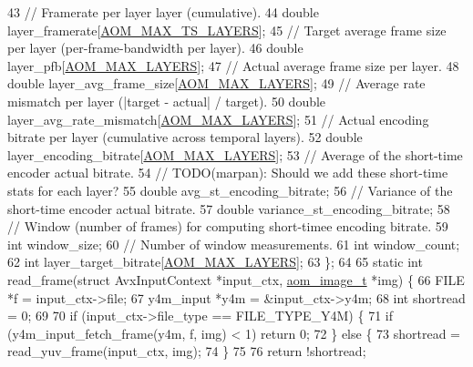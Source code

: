 \begin{DoxyCodeInclude}
43   \textcolor{comment}{// Framerate per layer layer (cumulative).}
44   \textcolor{keywordtype}{double} layer\_framerate[\hyperlink{group__aom__encoder_ga5ecd6f60f02c807e0de37df7b7278f4e}{AOM\_MAX\_TS\_LAYERS}];
45   \textcolor{comment}{// Target average frame size per layer (per-frame-bandwidth per layer).}
46   \textcolor{keywordtype}{double} layer\_pfb[\hyperlink{group__aom__encoder_ga3589babe0100b5bf7dc7167675014608}{AOM\_MAX\_LAYERS}];
47   \textcolor{comment}{// Actual average frame size per layer.}
48   \textcolor{keywordtype}{double} layer\_avg\_frame\_size[\hyperlink{group__aom__encoder_ga3589babe0100b5bf7dc7167675014608}{AOM\_MAX\_LAYERS}];
49   \textcolor{comment}{// Average rate mismatch per layer (|target - actual| / target).}
50   \textcolor{keywordtype}{double} layer\_avg\_rate\_mismatch[\hyperlink{group__aom__encoder_ga3589babe0100b5bf7dc7167675014608}{AOM\_MAX\_LAYERS}];
51   \textcolor{comment}{// Actual encoding bitrate per layer (cumulative across temporal layers).}
52   \textcolor{keywordtype}{double} layer\_encoding\_bitrate[\hyperlink{group__aom__encoder_ga3589babe0100b5bf7dc7167675014608}{AOM\_MAX\_LAYERS}];
53   \textcolor{comment}{// Average of the short-time encoder actual bitrate.}
54   \textcolor{comment}{// TODO(marpan): Should we add these short-time stats for each layer?}
55   \textcolor{keywordtype}{double} avg\_st\_encoding\_bitrate;
56   \textcolor{comment}{// Variance of the short-time encoder actual bitrate.}
57   \textcolor{keywordtype}{double} variance\_st\_encoding\_bitrate;
58   \textcolor{comment}{// Window (number of frames) for computing short-timee encoding bitrate.}
59   \textcolor{keywordtype}{int} window\_size;
60   \textcolor{comment}{// Number of window measurements.}
61   \textcolor{keywordtype}{int} window\_count;
62   \textcolor{keywordtype}{int} layer\_target\_bitrate[\hyperlink{group__aom__encoder_ga3589babe0100b5bf7dc7167675014608}{AOM\_MAX\_LAYERS}];
63 \};
64 
65 \textcolor{keyword}{static} \textcolor{keywordtype}{int} read\_frame(\textcolor{keyword}{struct} AvxInputContext *input\_ctx, \hyperlink{structaom__image}{aom\_image\_t} *img) \{
66   FILE *f = input\_ctx->file;
67   y4m\_input *y4m = &input\_ctx->y4m;
68   \textcolor{keywordtype}{int} shortread = 0;
69 
70   \textcolor{keywordflow}{if} (input\_ctx->file\_type == FILE\_TYPE\_Y4M) \{
71     \textcolor{keywordflow}{if} (y4m\_input\_fetch\_frame(y4m, f, img) < 1) \textcolor{keywordflow}{return} 0;
72   \} \textcolor{keywordflow}{else} \{
73     shortread = read\_yuv\_frame(input\_ctx, img);
74   \}
75 
76   \textcolor{keywordflow}{return} !shortread;

\end{DoxyCodeInclude}
